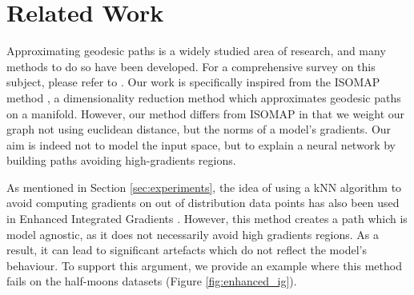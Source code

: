 \section{Related Work}
\label{sec:related_work}

Approximating geodesic paths is a widely studied area of research, and many methods to do so have been developed. For a comprehensive survey on this subject, please refer to \citet{crane2020survey}. Our work is specifically inspired from the ISOMAP method \citep{tenenbaum2000global}, a dimensionality reduction method which approximates geodesic paths on a manifold. However, our method differs from ISOMAP in that we weight our graph not using euclidean distance, but the norms of a model's gradients. Our aim is indeed not to model the input space, but to explain a neural network by building paths avoiding high-gradients regions.

As mentioned in Section \ref{sec:experiments}, the idea of using a kNN algorithm to avoid computing gradients on out of distribution data points has also been used in Enhanced Integrated Gradients \citet{jha2020enhanced}. However, this method creates a path which is model agnostic, as it does not necessarily avoid high gradients regions. As a result, it can lead to significant artefacts which do not reflect the model's behaviour. To support this argument, we provide an example where this method fails on the half-moons datasets (Figure \ref{fig:enhanced_ig}). 

